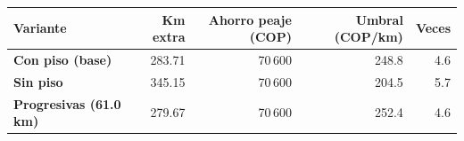 \renewcommand{\arraystretch}{1.2}
\begin{tabular}{|l|r|r|r|r|}
\hline
\rowcolor{gray!20} \textbf{Variante} & \textbf{Km extra} & \textbf{Ahorro peaje (COP)} & \textbf{Umbral (COP/km)} & \textbf{Veces} \\
\hline
\textbf{Con piso (base)} & 283.71 & 70\,600 & 248.8 & 4.6 \\
\hline
\textbf{Sin piso} & 345.15 & 70\,600 & 204.5 & 5.7 \\
\hline
\textbf{Progresivas (61.0 km)} & 279.67 & 70\,600 & 252.4 & 4.6 \\
\hline
\end{tabular}
